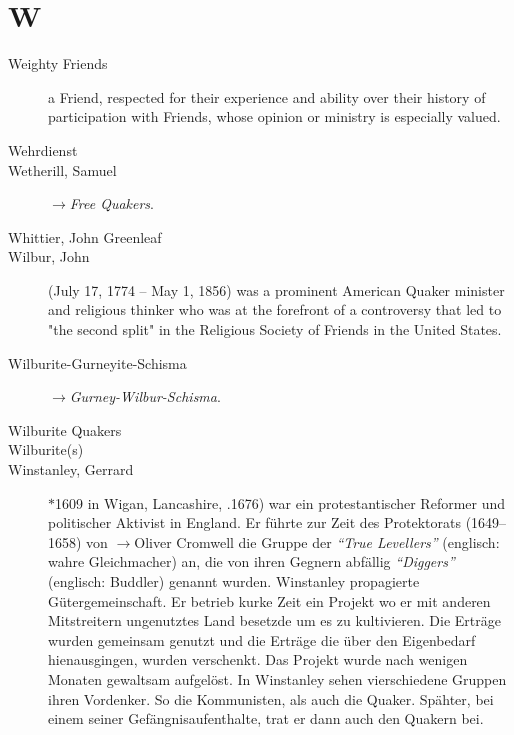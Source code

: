 \section*{W}

\articlesize

\begin{description}
 \item[Weighty Friends]
    a Friend, respected for their experience and ability over their history of participation with Friends, whose opinion or ministry is especially valued.

 
 \item[Wehrdienst]

 \item[Wetherill, Samuel] $\to$\textit{Free Quakers}.

 \item[Whittier, John Greenleaf]

 \item[Wilbur, John] (July 17, 1774 – May 1, 1856) was a prominent American Quaker minister and religious thinker who was at the forefront of a controversy that led to "the second split" in the Religious Society of Friends in the United States.

 \item[Wilburite-Gurneyite-Schisma] $\to$\textit{Gurney-Wilbur-Schisma}.

 \item[Wilburite Quakers]

 \item[Wilburite(s)]

 \item[Winstanley, Gerrard] $\ast$1609 in Wigan, Lancashire, .1676) war
 ein protestantischer Reformer und politischer Aktivist in England. Er führte
 zur Zeit des Protektorats (1649–1658) von $\to$Oliver Cromwell die Gruppe der
 \textit{"`True Levellers"'} (englisch: wahre Gleichmacher) an, die von ihren
 Gegnern abfällig \textit{"`Diggers"'} (englisch: Buddler) genannt wurden.
 Winstanley propagierte
 Gütergemeinschaft. Er betrieb kurke Zeit ein Projekt wo er mit anderen Mitstreitern
ungenutztes Land besetzde um es zu kultivieren. Die Erträge wurden gemeinsam
genutzt und die Erträge die über den Eigenbedarf hienausgingen, wurden verschenkt.
Das Projekt wurde nach wenigen Monaten gewaltsam aufgelöst. In Winstanley sehen
vierschiedene Gruppen ihren Vordenker. So die Kommunisten, als auch die Quaker.
Spähter, bei einem seiner Gefängnisaufenthalte, trat er dann auch den Quakern
bei. 


\end{description}
